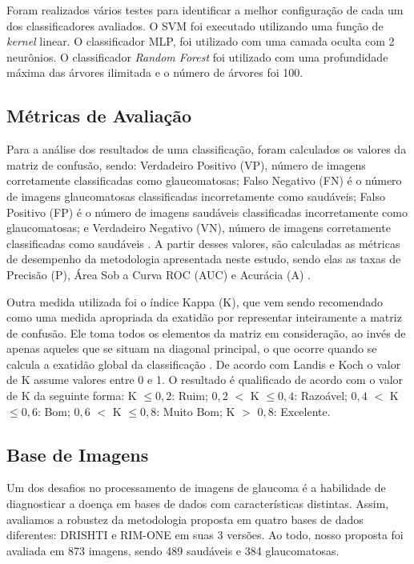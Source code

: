 \documentclass[fleqn,10pt]{SelfArx} %
\begin{document}
Foram realizados vários testes para identificar a melhor configuração de cada um dos classificadores avaliados. O SVM foi executado utilizando uma função de \textit{kernel} linear. O classificador MLP, foi utilizado com uma camada oculta com 2 neurônios. O classificador \textit{Random Forest} foi utilizado com uma profundidade máxima das árvores ilimitada e o número de árvores foi 100.



\subsection{Métricas de Avaliação}
\label{MA}

Para a análise dos resultados de uma classificação, foram calculados os valores da matriz de confusão, sendo: Verdadeiro Positivo (VP), número de imagens corretamente classificadas como glaucomatosas; Falso Negativo (FN) é o número de imagens glaucomatosas classificadas incorretamente como saudáveis; Falso Positivo (FP) é o número de imagens saudáveis classificadas incorretamente como glaucomatosas; e Verdadeiro Negativo (VN), número de imagens corretamente classificadas como saudáveis \cite{chimieski2013association}. A partir desses valores, são calculadas as métricas de desempenho da metodologia apresentada neste estudo, sendo elas as taxas de Precisão (P), Área Sob a Curva ROC (AUC) e Acurácia (A) \cite{powers2007evaluation}.

Outra medida utilizada foi o índice Kappa (K), que vem sendo recomendado como uma medida apropriada da exatidão por representar inteiramente a matriz de confusão. Ele toma todos os elementos da matriz em consideração, ao invés de apenas aqueles que se situam na diagonal principal, o que ocorre quando se calcula a exatidão global da classificação \cite{rosenfield1986coefficient}. De acordo com Landis e Koch \cite{landis1977measurement} o valor de K assume valores entre 0 e 1. O resultado é qualificado de acordo com o valor de K da seguinte forma: K $\leq 0,2 $: Ruim; $0,2$ $<$ K $\leq 0,4 $: Razoável; $0,4$ $<$ K $\leq 0,6 $: Bom; $0,6$ $<$ K $\leq 0,8 $: Muito Bom; K $>$ $0,8$: Excelente. 

\subsection{Base de Imagens}

Um dos desafios no processamento de imagens de glaucoma é a habilidade de diagnosticar a doença em bases de dados com características distintas. Assim, avaliamos a robustez da metodologia proposta em quatro bases de dados diferentes: DRISHTI \cite{sivaswamy2014drishti} e RIM-ONE \cite{Fumero:2011} em suas 3 versões. Ao todo, nosso proposta foi avaliada em 873 imagens, sendo 489 saudáveis e 384 glaucomatosas.
\end{document}
